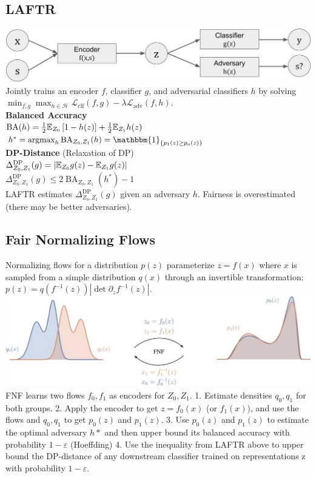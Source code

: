 \subsection*{LAFTR}
\includegraphics[width=1\columnwidth]{img/laftr.png}
Jointly trains an encoder $f$, classifier $g$, and adversarial classifiers $h$ by solving\\
$\min_{f,g}\max_{h\in\mathcal{H}} \mathcal{L}_{\text{clf}}(f,g)-\lambda \mathcal{L}_{\text{adv}}(f,h)$.\\
\textbf{Balanced Accuracy}\\
$\operatorname{BA}(h)=\frac{1}{2}\mathbb{E}_{Z_0}\left[1-h(z)\right]+\frac{1}{2}\mathbb{E}_{Z_1}h(z)$\\
$h^*=\argmax_h\operatorname{BA}_{Z_0,Z_1}(h)=\mathbbm{1}_{\{p_1(z)\geq p_o(z)\}}$\\
\textbf{DP-Distance} (Relaxation of DP)\\
$\Delta^{\text{DP}}_{Z_0,Z_1}(g)=\left|\mathbb{E}_{Z_0}g(z)-\mathbb{E}_{Z_1}g(z)\right|$\\
$\Delta^{\text{DP}}_{Z_0,Z_1}(g)\leq2\operatorname{BA}_{Z_0,Z_1}(h^*)-1$\\
LAFTR estimates $\Delta^{\text{DP}}_{Z_0,Z_1}(g)$ given an adversary $h$. Fairness is overestimated (there may be better adversaries).

\subsection*{Fair Normalizing Flows}
Normalizing flows for a distribution $p(z)$ parameterize $z=f(x)$ where $x$ is sampled from a simple distribution $q(x)$ through an invertible transformation: $p(z)=q(f^{-1}(z))\left|\det{\partial_z f^{-1}}(z)\right|.$\\
\includegraphics[width=1\columnwidth]{img/fnf.png}
FNF learns two flows $f_0,f_1$ as encoders for $Z_0,Z_1$. 1. Estimate densities $q_0, q_1$ for both groups. 2. Apply the encoder to get $z=f_0(x)$ (or $f_1(x)$), and use the flows and $q_0,q_1$ to get $p_0(z)$ and $p_1(z)$. 3. Use $p_0(z)$ and $p_1(z)$ to estimate the optimal adversary $h*$ and then upper bound its balanced accuracy with probability $1-\varepsilon$ (Hoeffding) 4. Use the inequality from LAFTR above to upper bound the DP-distance of any downstream classifier trained on representations z with probability $1-\varepsilon$.

